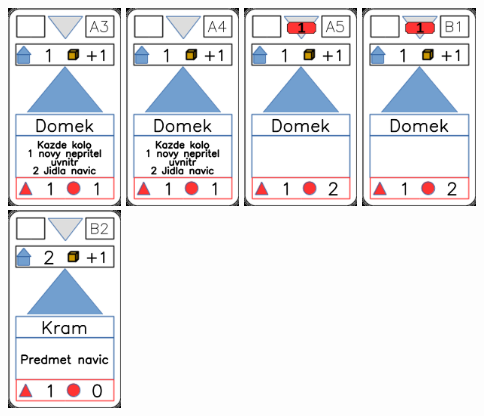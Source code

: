 \documentclass[a4paper]{article}
\begin{document}
	\includegraphics[width=3.0cm]{img-3_2}
	\includegraphics[width=3.0cm]{img-3_3}
	\includegraphics[width=3.0cm]{img-3_4}
	\includegraphics[width=3.0cm]{img-3_5}
	\includegraphics[width=3.0cm]{img-3_6}
\end{document}
